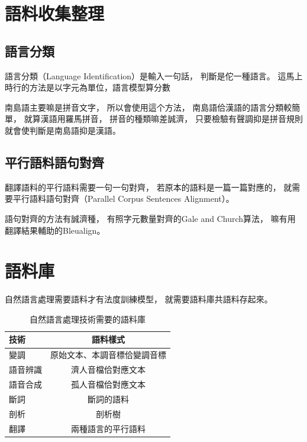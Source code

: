 \section{語料收集整理}
\label{節：語料收集整理}
%
%
%

\subsection{語言分類}
\label{小節：語言分類}
語言分類（Language Identification）是輸入一句話，
判斷是佗一種語言。
這馬上時行的方法是以字元為單位，語言模型算分數\cite{cavnar1994n}

南島語主要嘛是拼音文字，
所以會使用這个方法，
南島語佮漢語的語言分類較簡單，
就算漢語用羅馬拼音，
拼音的種類嘛差誠濟，
只要檢驗有聲調抑是拼音規則就會使判斷是南島語抑是漢語。

\subsection{平行語料語句對齊}
\label{小節：語句對齊}
翻譯語料的平行語料需要一句一句對齊，
若原本的語料是一篇一篇對應的，
就需要平行語料語句對齊（Parallel Corpus Sentences Alignment）。

語句對齊的方法有誠濟種，
有照字元數量對齊的Gale and Church算法\cite{gale1993program}，
嘛有用翻譯結果輔助的Bleualign\cite{zora38464}。

\section{語料庫}
\label{節：語料庫}
自然語言處理需要語料才有法度訓練模型，
就需要語料庫共語料存起來。

\begin{table}
\caption{自然語言處理技術需要的語料庫}
\label{表：自然語言處理技術需要的語料庫}
\centering
\begin{tabular}{l|c}
技術 & 語料樣式 \\
\hline
變調 & 原始文本、本調音標佮變調音標 \\
語音辨識 & 濟人音檔佮對應文本 \\
語音合成 & 孤人音檔佮對應文本 \\
斷詞 & 斷詞的語料 \\
剖析 & 剖析樹 \\
翻譯 & 兩種語言的平行語料 \\
\end{tabular}
\end{table}

